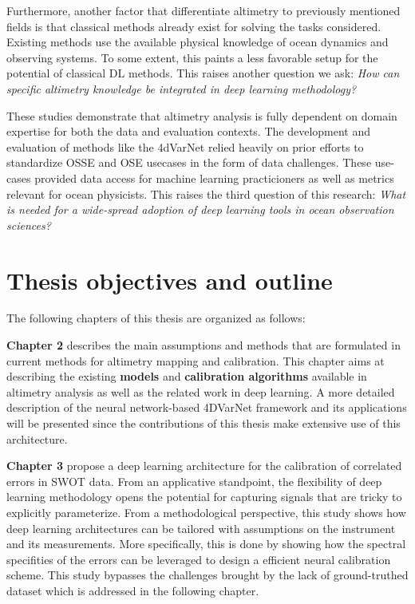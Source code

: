 \begin{bibunit}
Furthermore, another factor that differentiate altimetry to previously mentioned fields is that classical methods already exist for solving the tasks considered. Existing methods use the available physical knowledge of ocean dynamics and observing systems. To some extent, this paints a less favorable setup for the potential of classical DL methods.
This raises another question we ask: \textit{How can specific altimetry knowledge be integrated in deep learning methodology?}


These studies demonstrate that altimetry analysis is fully dependent on domain expertise for both the data and evaluation contexts.
The development and evaluation of methods like the 4dVarNet relied heavily on prior efforts to standardize OSSE and OSE usecases in the form of data challenges\cite{ballarottaOceandatachallenges2020a_SSH_mapping_NATL60Material2020,ballarottaOceandatachallenges2021a_SSH_mapping_OSEMaterial2021}. These use-cases provided data access for machine learning practicioners as well as metrics relevant for ocean physicists. 
This raises the third question of this research: \textit{What is needed for a wide-spread adoption of deep learning tools in ocean observation sciences?}




\section{Thesis objectives and outline}

The following chapters of this thesis are organized as follows:

\textbf{Chapter 2} describes the main assumptions and methods that are formulated in current methods for altimetry mapping and calibration. This chapter aims at describing the existing \textbf{models} and \textbf{calibration algorithms} available in altimetry analysis as well as the related work in deep learning. A more detailed description of the neural network-based 4DVarNet framework and its applications will be presented since the contributions of this thesis make extensive use of this architecture.

\textbf{Chapter 3} propose a deep learning architecture for the calibration of correlated errors in SWOT data.
From an applicative standpoint, the flexibility of deep learning methodology opens the potential for capturing signals that are tricky to explicitly parameterize.
From a methodological perspective, this study shows how deep learning architectures can be tailored with assumptions on the instrument and its measurements.
More specifically, this is done by showing how the spectral specifities of the errors can be leveraged to design a efficient neural calibration scheme.
This study bypasses the challenges brought by the lack of ground-truthed dataset which is addressed in the following chapter.



\end{bibunit}
